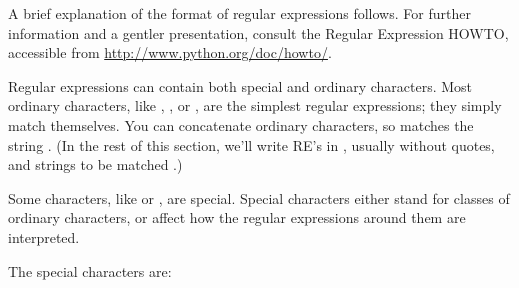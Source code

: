 A brief explanation of the format of regular expressions follows.  For
further information and a gentler presentation, consult the Regular
Expression HOWTO, accessible from \url{http://www.python.org/doc/howto/}.

Regular expressions can contain both special and ordinary characters.
Most ordinary characters, like , , or ,
are the simplest regular expressions; they simply match themselves.  
You can concatenate ordinary characters, so  matches the
string .  (In the rest of this section, we'll write RE's in
, usually without quotes, and strings to be
matched .)

Some characters, like \character{|} or \character{(}, are special.  Special
characters either stand for classes of ordinary characters, or affect
how the regular expressions around them are interpreted.

The special characters are:
\newcommand{\MyLeftMargin}{0.7in}
\newcommand{\MyLabelWidth}{0.65in}

